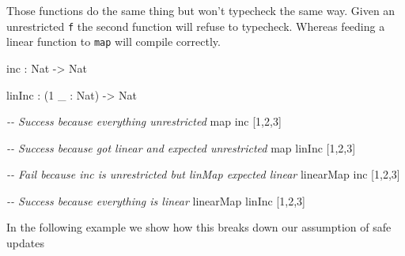 \documentclass[
]{article}
\newenvironment{Shaded}{}{}
\newcommand{\CommentTok}[1]{\textcolor[rgb]{0.38,0.63,0.69}{\textit{#1}}}
\newcommand{\DataTypeTok}[1]{\textcolor[rgb]{0.56,0.13,0.00}{#1}}
\newcommand{\DecValTok}[1]{\textcolor[rgb]{0.25,0.63,0.44}{#1}}
\newcommand{\FunctionTok}[1]{\textcolor[rgb]{0.02,0.16,0.49}{#1}}
\newcommand{\KeywordTok}[1]{\textcolor[rgb]{0.00,0.44,0.13}{\textbf{#1}}}
\newcommand{\NormalTok}[1]{#1}
\newcommand{\OperatorTok}[1]{\textcolor[rgb]{0.40,0.40,0.40}{#1}}
\newcommand{\OtherTok}[1]{\textcolor[rgb]{0.00,0.44,0.13}{#1}}
\begin{document}
Those functions do the same thing but won't typecheck the same way.
Given an unrestricted \texttt{f} the second function will refuse to
typecheck. Whereas feeding a linear function to \texttt{map} will
compile correctly.

\begin{Shaded}
\begin{Highlighting}[]
\NormalTok{inc }\OperatorTok{:} \DataTypeTok{Nat} \OtherTok{{-}\textgreater{}} \DataTypeTok{Nat}

\NormalTok{linInc }\OperatorTok{:}\NormalTok{ (}\DecValTok{1}\NormalTok{ \_ }\OperatorTok{:} \DataTypeTok{Nat}\NormalTok{) }\OtherTok{{-}\textgreater{}} \DataTypeTok{Nat}

\CommentTok{{-}{-} Success because everything unrestricted}
\FunctionTok{map}\NormalTok{ inc [}\DecValTok{1}\NormalTok{,}\DecValTok{2}\NormalTok{,}\DecValTok{3}\NormalTok{] }

\CommentTok{{-}{-} Success because got linear and expected unrestricted}
\FunctionTok{map}\NormalTok{ linInc [}\DecValTok{1}\NormalTok{,}\DecValTok{2}\NormalTok{,}\DecValTok{3}\NormalTok{]}

\CommentTok{{-}{-} Fail because inc is unrestricted but linMap expected linear}
\NormalTok{linearMap inc [}\DecValTok{1}\NormalTok{,}\DecValTok{2}\NormalTok{,}\DecValTok{3}\NormalTok{]}

\CommentTok{{-}{-} Success because everything is linear}
\NormalTok{linearMap linInc [}\DecValTok{1}\NormalTok{,}\DecValTok{2}\NormalTok{,}\DecValTok{3}\NormalTok{]}
\end{Highlighting}
\end{Shaded}

In the following example we show how this breaks down our assumption of
safe updates

\begin{Shaded}
\end{Shaded}
\end{document}
